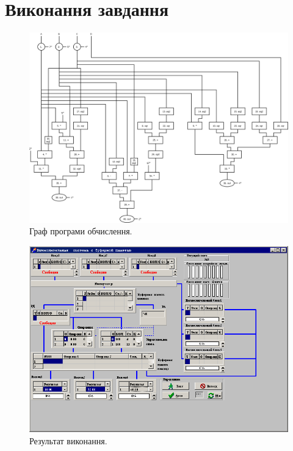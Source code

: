 \documentclass[a4paper, 10pt]{article}
\begin{document}
\section{Виконання завдання}
\begin{figure}[H]
\begin{center}
\includegraphics[scale=0.3, angle=90]{lab3_alg.png}
\caption{Граф програми обчислення.}
\end{center}
\end{figure}

\begin{figure}[H]
\begin{center}
\includegraphics[scale=0.75]{lab3.png}
\caption{Результат виконання.}
\end{center}
\end{figure}
\end{document}
